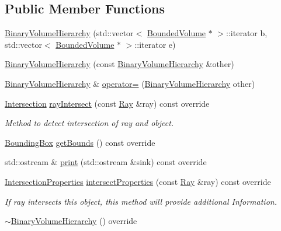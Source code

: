 \subsection*{Public Member Functions}
\begin{DoxyCompactItemize}
\item 
\hyperlink{classBinaryVolumeHierarchy_afb1953933b78a2005884a7a34cb64519}{Binary\+Volume\+Hierarchy} (std\+::vector$<$ \hyperlink{classBoundedVolume}{Bounded\+Volume} $\ast$ $>$\+::iterator b, std\+::vector$<$ \hyperlink{classBoundedVolume}{Bounded\+Volume} $\ast$ $>$\+::iterator e)
\item 
\hyperlink{classBinaryVolumeHierarchy_a4a45b2c778163d01304beb57b6d19bd3}{Binary\+Volume\+Hierarchy} (const \hyperlink{classBinaryVolumeHierarchy}{Binary\+Volume\+Hierarchy} \&other)
\item 
\hyperlink{classBinaryVolumeHierarchy}{Binary\+Volume\+Hierarchy} \& \hyperlink{classBinaryVolumeHierarchy_af15afa9493fbc0d3cfffbbc3c2bfbe99}{operator=} (\hyperlink{classBinaryVolumeHierarchy}{Binary\+Volume\+Hierarchy} other)
\item 
\hyperlink{classIntersection}{Intersection} \hyperlink{classBinaryVolumeHierarchy_a1eda3a8f9a52d44cd483d9bc2807b38a}{ray\+Intersect} (const \hyperlink{classRay}{Ray} \&ray) const override
\begin{DoxyCompactList}\small\item\em Method to detect intersection of ray and object. \end{DoxyCompactList}\item 
\hyperlink{classBoundingBox}{Bounding\+Box} \hyperlink{classBinaryVolumeHierarchy_af4875ad00fe5c6430067e00647918b5a}{get\+Bounds} () const override
\item 
std\+::ostream \& \hyperlink{classBinaryVolumeHierarchy_ad92d27372aef59591ddc239685ca770d}{print} (std\+::ostream \&sink) const override
\item 
\hyperlink{classIntersectionProperties}{Intersection\+Properties} \hyperlink{classBinaryVolumeHierarchy_af3c2277401a26961295a2b0ac18b1dd4}{intersect\+Properties} (const \hyperlink{classRay}{Ray} \&ray) const override
\begin{DoxyCompactList}\small\item\em If ray intersects this object, this method will provide additional Information. \end{DoxyCompactList}\item 
\hyperlink{classBinaryVolumeHierarchy_a760800685de78279be3619c4ee4170cf}{$\sim$\+Binary\+Volume\+Hierarchy} () override
\end{DoxyCompactItemize}
